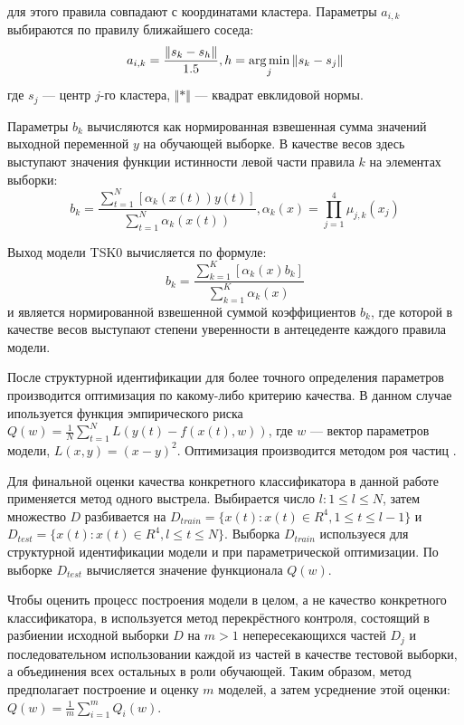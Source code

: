 для этого правила совпадают с координатами кластера. Параметры \(a_{i,k}\) выбираются
по правилу ближайшего соседа:
\begin{displaymath}
a_{i,k}=\frac{\Vert s_k-s_h\Vert}{1.5},h=\operatorname*{arg\,min}_{j}\Vert s_k-s_j\Vert
\end{displaymath}
где \(s_j\) --- центр \(j\)-го кластера, \(\Vert * \Vert\) --- квадрат евклидовой нормы.
\par
Параметры \(b_k\) вычисляются как нормированная взвешенная сумма значений выходной переменной \(y\)
на обучающей выборке. В качестве весов здесь выступают значения функции истинности левой части
правила \(k\) на элементах выборки:
\begin{displaymath}
  b_k=\frac{\sum_{t=1}^{N}[\alpha_k(x(t))y(t)]}{\sum_{t=1}^{N}\alpha_k(x(t))},
  \alpha_k(x)=\prod_{j=1}^{4}\mu_{j,k}(x_j)
\end{displaymath}
\par
Выход модели TSK0 вычисляется по формуле:
\begin{displaymath}
  b_k=\frac{\sum_{k=1}^{K}[\alpha_k(x)b_k]}{\sum_{k=1}^{K}\alpha_k(x)}
\end{displaymath}
и является нормированной взвешенной суммой коэффициентов \(b_k\), где которой в
качестве весов выступают степени уверенности в антецеденте каждого правила модели.
\par
После структурной идентификации для более точного определения параметров
производится оптимизация по какому-либо критерию качества. В данном
случае ипользуется функция эмпирического риска \(Q(w)=\frac{1}{N}\sum_{t=1}^{N}L(y(t)-f(x(t),w))\),
где \(w\) --- вектор параметров модели, \(L(x,y)=(x-y)^2\). Оптимизация производится
методом роя частиц \cite{pso}.
\par
Для финальной оценки качества конкретного классификатора в данной работе применяется
метод одного выстрела. Выбирается число \(l:1\leqslant l\leqslant N\),
затем множество \(D\) разбивается на \(D_{train} = \{x(t):x(t)\in R^4, 1 \leqslant t \leqslant l-1\}\)
и \(D_{test} = \{x(t):x(t)\in R^4, l \leqslant t \leqslant N\}\). Выборка \(D_{train}\)
используеся для структурной идентификации модели и при параметрической оптимизации.
По выборке \(D_{test}\) вычисляется значение функционала \(Q(w)\).
\par
Чтобы оценить процесс построения модели в целом, а не качество конкретного классификатора,
в используется метод перекрёстного контроля, состоящий в разбиении исходной выборки
\(D\) на \(m>1\) непересекающихся частей \(D_j\) и последовательном использовании
каждой из частей в качестве тестовой выборки, а объединения всех остальных в роли
обучающей. Таким образом, метод предполагает построение и оценку \(m\) моделей, а
затем усреднение этой оценки: \(Q(w)=\frac{1}{m} \sum_{i=1}^{m}Q_i(w)\).
